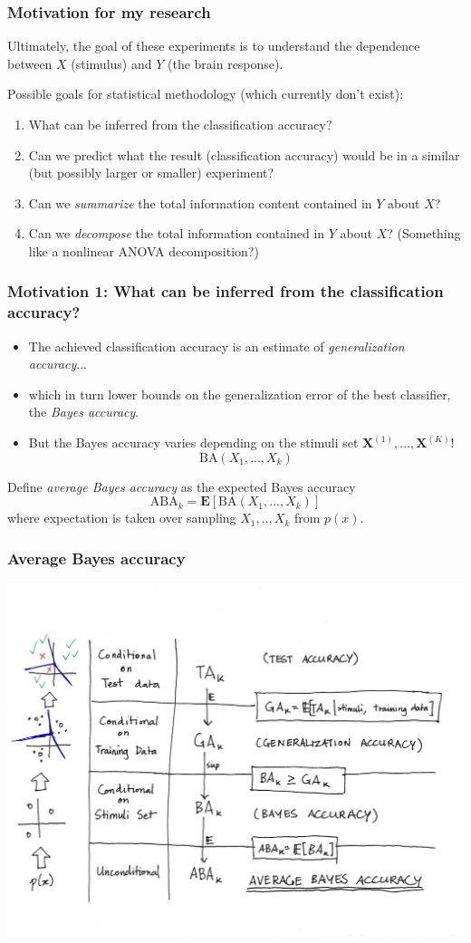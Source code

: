 \documentclass{beamer}
\newcommand{\E}{\textbf{E}}
\newcommand{\bX}{\boldsymbol{X}}
\begin{document}
\begin{frame}
\frametitle{Motivation for my research}
Ultimately, the goal of these experiments is to understand the
  dependence between $X$ (stimulus) and $Y$ (the brain response). 

Possible goals for statistical methodology (which currently don't exist):
\begin{enumerate}
\item What can be inferred from the classification accuracy?
\item Can we predict what the result (classification accuracy) would be in a similar (but possibly larger or smaller) experiment?
\item Can we \emph{summarize} the total information content contained
  in $Y$ about $X$?
\item Can we \emph{decompose} the total information contained in $Y$ about $X$?  (Something like a nonlinear ANOVA decomposition?)
\end{enumerate}
\end{frame}

\begin{frame}
\frametitle{Motivation 1: What can be inferred from the classification accuracy?}
\begin{itemize}
\item The achieved classification accuracy is an estimate of \emph{generalization accuracy}...
\item which in turn lower bounds on the generalization error of the best classifier, the \emph{Bayes accuracy}.
\item But the Bayes accuracy varies depending on the stimuli set $\bX^{(1)},\hdots, \bX^{(K)}$!
\[
\text{BA}(X_1,...,X_k)
\]
\end{itemize}
Define \emph{average Bayes accuracy} as the expected Bayes accuracy
\[
\text{ABA}_k = \E[\text{BA}(X_1,...,X_k)]
\]
where expectation is taken over sampling $X_1,..,X_k$ from $p(x)$.
\end{frame}

\begin{frame}
\frametitle{Average Bayes accuracy}
\includegraphics[scale = 0.45, clip = true, trim = 0in 1in 0.5in 1in]{ta_to_aba.png}
\end{frame}
\end{document}
